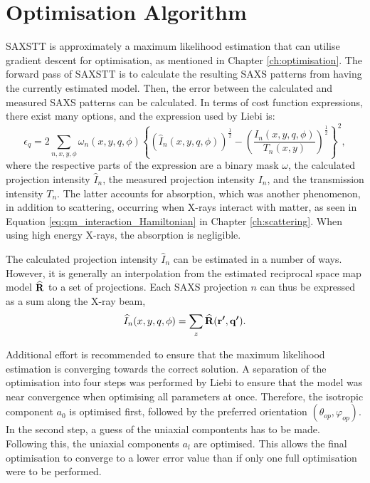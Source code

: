 \section{Optimisation Algorithm}

SAXSTT is approximately a maximum likelihood estimation that can utilise gradient descent for optimisation, as mentioned in Chapter \ref{ch:optimisation}.
The forward pass of SAXSTT is to calculate the resulting SAXS patterns from having the currently estimated model.
Then, the error between the calculated and measured SAXS patterns can be calculated.
In terms of cost function expressions, there exist many options, and the expression used by Liebi \cite{liebi2018small} is:
\begin{equation}\label{eq:cost_function_SAXSTT}
    \epsilon_{q} = 2 \sum_{n, x, y, \phi} \omega_{n}(x,y,q,\phi) \left\{ \left( \widehat{I}_{n}(x,y,q,\phi) \right)^{\frac{1}{2}}  -  \left( \frac{ I_{n}(x,y,q,\phi) }{T_{n}(x,y)} \right)^{\frac{1}{2}} \right\}^{2},
\end{equation}
\noindent
where the respective parts of the expression are a binary mask $\omega$, the calculated projection intensity $\widehat{I}_{n}$, the measured projection intensity $I_{n}$, and the transmission intensity $T_{n}$.
The latter accounts for absorption, which was another phenomenon, in addition to scattering, occurring when X-rays interact with matter,
as seen in Equation \eqref{eq:qm_interaction_Hamiltonian} in Chapter \ref{ch:scattering}. When using high energy X-rays, the absorption is negligible.

The calculated projection intensity $\widehat{I}_{n}$ can be estimated in a number of ways.
However, it is generally an interpolation from the estimated reciprocal space map model $\bm{\mathrm{\widehat{R}}}$ to a set of projections.
Each SAXS projection $n$ can thus be expressed as a sum along the X-ray beam,
\begin{equation}\label{eq:SAXS_intensity}
    \widehat{I}_{n}(x,y,q,\phi) = \sum_{z} \bm{\widehat{\mathrm{R}}}(\bm{\mathrm{r'}}, \bm{\mathrm{q'}}).
\end{equation}

Additional effort is recommended to ensure that the maximum likelihood estimation is converging towards the correct solution.
A separation of the optimisation into four steps was performed by Liebi \cite{liebi2018small} to ensure that the model was near convergence when optimising all parameters at once.
Therefore, the isotropic component $a_{0}$ is optimised first, followed by the preferred orientation $(\theta_{op}, \varphi_{op})$. In the second step, a guess of the uniaxial compontents has to be made.
Following this, the uniaxial components $a_{l}$ are optimised.
This allows the final optimisation to converge to a lower error value than if only one full optimisation were to be performed.


